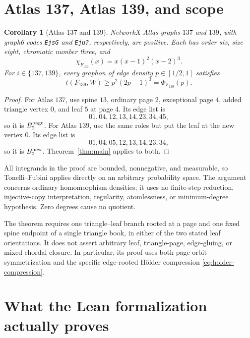 \documentclass[11pt]{article}
\newtheorem{corollary}[theorem]{Corollary}
\begin{document}
\section{Atlas 137, Atlas 139, and scope}

\begin{corollary}[Atlas 137 and 139]
NetworkX Atlas graphs $137$ and $139$, with graph6 codes \texttt{EjsG} and
\texttt{Eju?}, respectively, are positive.  Each has order six, size eight,
chromatic number three, and
\[
 \chi_{F_{139}}(x)=x(x-1)^2(x-2)^3.
\]
For $i\in\{137,139\}$, every graphon of edge density $p\in[1/2,1]$
satisfies
\[
 t(F_{139},W)\geq p^2(2p-1)^3=\Phi_{F_{139}}(p).
\]
\end{corollary}

\begin{proof}
For Atlas $137$, use spine $13$, ordinary page $2$, exceptional page $4$,
added triangle vertex $0$, and leaf $5$ at page $4$.  Its edge list is
\[
 01,04,12,13,14,23,34,45,
\]
so it is $B_2^{\rm page}$.  For Atlas $139$, use the same roles but put the
leaf at the new vertex $0$.  Its edge list is
\[
 01,04,05,12,13,14,23,34,
\]
so it is $B_2^{\rm new}$.  Theorem~\ref{thm:main} applies to both.
\end{proof}

All integrands in the proof are bounded, nonnegative, and measurable, so
Tonelli--Fubini applies directly on an arbitrary probability space.  The
argument concerns ordinary homomorphism densities; it uses no finite-step
reduction, injective-copy interpretation, regularity, atomlessness, or
minimum-degree hypothesis.  Zero degrees cause no quotient.

The theorem requires one triangle--leaf branch rooted at a page and one
fixed spine endpoint of a single triangle book, in either of the two stated
leaf orientations.  It does not assert arbitrary leaf,
triangle-page, edge-gluing, or mixed-chordal closure.  In particular, its
proof uses both page-orbit symmetrization and the specific edge-rooted
H\"older compression \eqref{eq:holder-compression}.


\appendix
\section{What the Lean formalization actually proves}
\end{document}
